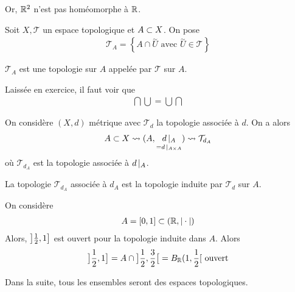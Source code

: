\documentclass[french,a4paper,10pt]{article}
\begin{document}
		Or, $\mathbb{R}^2$ n'est pas homéomorphe à $\mathbb{R}$.
		\begin{definition}
			Soit $X,\mathcal T$ un espace topologique et $A\subset X$. On pose
				\[\begin{aligned}
					\mathcal T_A=\left\{A\cap \overset\sim U\text{ avec }\overset\sim U\in\mathcal T\right\}
				\end{aligned}\]
		\end{definition}
		
		\begin{propdef}
			$\mathcal T_A$ est une topologie sur $A$ appelée  par $\mathcal T$ sur $A$.
		\end{propdef}
	
		\begin{myproof}
			Laissée en exercice, il faut voir que
				\[\begin{aligned}
					\bigcap\bigcup=\bigcup\bigcap
				\end{aligned}\]
		\end{myproof}
	
		\begin{example}
			On considère $(X,d)$ métrique avec $\mathcal T_d$ la topologie associée à $d$. On a alors
				\[\begin{aligned}
					A\subset X\rightsquigarrow(A,\underset{=d\mathop{}\!|_{A\times A}}{d\mathop{}\!|_{A}})\rightsquigarrow\mathcal T_{d_A}
				\end{aligned}\]
			où $\mathcal T_{d_A}$ est la topologie associée à $d\mathop{}\!|_{A}$.
		\end{example}
	
		\begin{proposition}
			La topologie $\mathcal T_{d_A}$ associée à $d_A$ est la topologie induite par $\mathcal T_d$ sur $A$.
		\end{proposition}
	
		\begin{example}
			On considère 
				\[\begin{aligned}
					A=\mathopen{[}0, 1\mathclose{]}\subset \left(\mathbb{R}, |\cdot|\right)
				\end{aligned}\]
			Alors, $\mathopen{\big]}\frac12,1\mathclose{\big]}$ est ouvert pour la topologie induite dans $A$. Alors
				\[\begin{aligned}
					\mathopen{\big]}\frac12,1\mathclose{\big]}=A\cap\mathopen{\big]}\frac12,\frac32\mathclose{\big[}= B_{\mathbb{R}}(1,\frac12[\text{ ouvert}
				\end{aligned}\]
		\end{example}
	
		Dans la suite, tous les ensembles seront des espaces topologiques.
		
\end{document}

